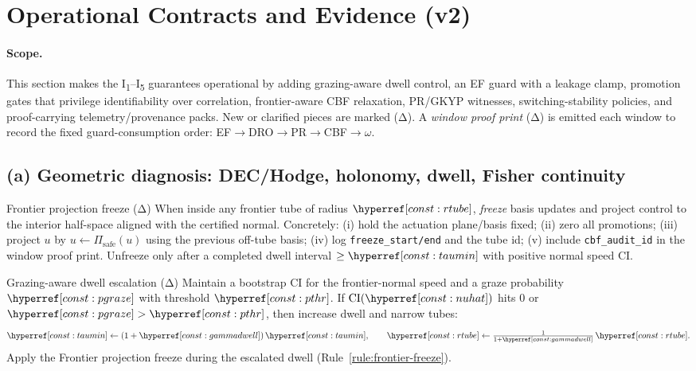 \section{Operational Contracts and Evidence (v2)}\label{sec:ops-v2}

\paragraph{Scope.}
This section makes the I\textsubscript{1}–I\textsubscript{5} guarantees operational by adding grazing-aware dwell control, an EF guard with a leakage clamp, promotion gates that privilege identifiability over correlation, frontier-aware CBF relaxation, PR/GKYP witnesses, switching-stability policies, and proof-carrying telemetry/provenance packs. New or clarified pieces are marked (Δ). A \emph{window proof print} (Δ) is emitted each window to record the fixed guard-consumption order: EF$\rightarrow$DRO$\rightarrow$PR$\rightarrow$CBF$\rightarrow\omega$.

\subsection{(a) Geometric diagnosis: DEC/Hodge, holonomy, dwell, Fisher continuity}\label{subsec:ops-geom}
\emph{}

\begin{rulex}{Frontier projection freeze (Δ)}\label{rule:frontier-freeze}
When inside any frontier tube of radius $\constref{rtube}$, \emph{freeze} basis updates and project control to the interior half-space aligned with the certified normal. Concretely: (i) hold the actuation plane/basis fixed; (ii) zero all promotions; (iii) project $u$ by $u\leftarrow \Pi_{\mathrm{safe}}(u)$ using the previous off-tube basis; (iv) log \texttt{freeze\_start/end} and the tube id; (v) include \texttt{cbf\_audit\_id} in the window proof print. Unfreeze only after a completed dwell interval $\ge\constref{taumin}$ with positive normal speed CI.
\end{rulex}

\begin{rulex}{Grazing-aware dwell escalation (Δ)}\label{rule:grazing}
Maintain a bootstrap CI for the frontier-normal speed and a graze probability $\constref{pgraze}$ with threshold $\constref{pthr}$. If $\mathrm{CI}(\constref{nuhat})$ hits $0$ or $\constref{pgraze}>\constref{pthr}$, then increase dwell and narrow tubes:
\[
\constref{taumin}\leftarrow (1+\constref{gammadwell})\,\constref{taumin},\qquad
\constref{rtube}\leftarrow \tfrac{1}{1+\constref{gammadwell}}\,\constref{rtube}.
\]
Apply the Frontier projection freeze during the escalated dwell (Rule~\ref{rule:frontier-freeze}).
\end{rulex}

